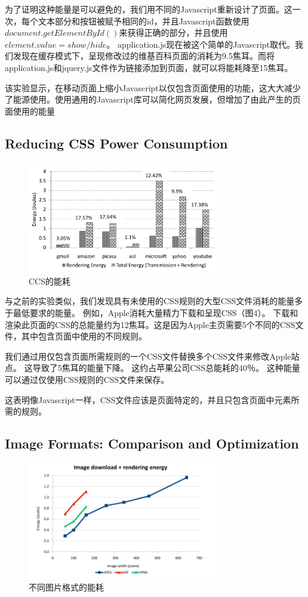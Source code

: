 \documentclass{sig-alternate-05-2015}
\begin{document}
为了证明这种能量是可以避免的，我们用不同的Javascript重新设计了页面。这一次，每个文本部分和按钮被赋予相同的id，并且Javascript函数使用$document.getElementById()$来获得正确的部分，并且使用$element.value = show/hide$。 application.js现在被这个简单的Javascript取代。我们发现在缓存模式下，呈现修改过的维基百科页面的消耗为9.5焦耳。而将application.js和jquery.js文件作为链接添加到页面，就可以将能耗降至15焦耳。

该实验显示，在移动页面上缩小Javascript以仅包含页面使用的功能，这大大减少了能源使用。使用通用的Javascript库可以简化网页发展，但增加了由此产生的页面使用的能量

\subsection{Reducing CSS Power Consumption}

\begin{figure}[htbp]
	\centering
	\includegraphics[width=3.4in]{./figure3}
	\caption{CCS的能耗}\label{fig:tasks}
\end{figure}

与之前的实验类似，我们发现具有未使用的CSS规则的大型CSS文件消耗的能量多于最低要求的能量。 例如，Apple消耗大量精力下载和呈现CSS（图4\cite{13}）。 下载和渲染此页面的CSS的总能量约为12焦耳。这是因为Apple主页需要5个不同的CSS文件，其中包含页面中使用的不同规则。

我们通过用仅包含页面所需规则的一个CSS文件替换多个CSS文件来修改Apple站点。 这导致了5焦耳的能量下降。 这约占苹果公司CSS总能耗的40％。 这种能量可以通过仅使用CSS规则的CSS文件来保存。

这表明像Javascript一样，CSS文件应该是页面特定的，并且只包含页面中元素所需的规则。

\subsection{Image Formats: Comparison and Optimization}

\begin{figure}[htbp]
	\centering
	\includegraphics[width=3.4in]{./figure4}
	\caption{不同图片格式的能耗}\label{fig:tasks}
\end{figure}
\end{document}
